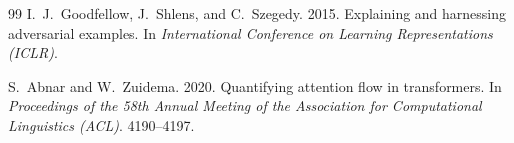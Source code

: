 \documentclass[sigconf]{acmart}
\begin{document}
\begin{thebibliography}{99}
I.\ J.\ Goodfellow, J.\ Shlens, and C.\ Szegedy. 2015. Explaining and harnessing adversarial examples. In \textit{International Conference on Learning Representations (ICLR)}.

S.\ Abnar and W.\ Zuidema. 2020. Quantifying attention flow in transformers. In \textit{Proceedings of the 58th Annual Meeting of the Association for Computational Linguistics (ACL)}. 4190--4197.

\end{thebibliography}
\end{document}
